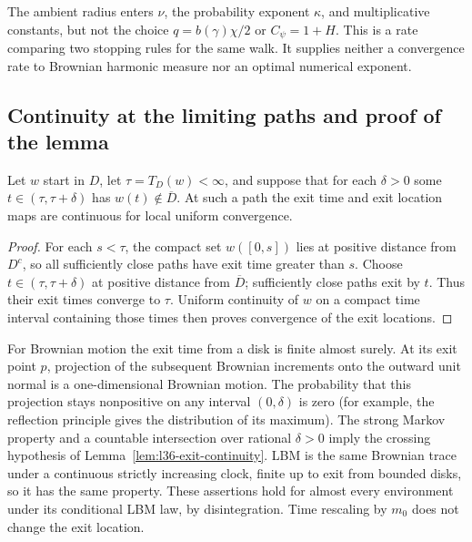 The ambient radius enters $\nu$, the probability exponent
$\kappa$, and multiplicative constants, but not the choice
$q=b(\gamma)\chi/2$ or $C_\psi=1+H$.
This is a rate comparing two stopping rules for the same walk.
It supplies neither a convergence rate to Brownian harmonic
measure nor an optimal numerical exponent.

\subsection{Continuity at the limiting paths and proof of the lemma}
\begin{lemma}\label{lem:l36-exit-continuity}
Let $w$ start in $D$, let $\tau=T_D(w)<\infty$, and suppose that
for each $\delta>0$ some $t\in(\tau,\tau+\delta)$ has
$w(t)\notin\overline D$. At such a path the exit time and exit
location maps are continuous for local uniform convergence.
\end{lemma}
\begin{proof}
For each $s<\tau$, the compact set $w([0,s])$ lies at positive
distance from $D^c$, so all sufficiently close paths have exit
time greater than $s$. Choose $t\in(\tau,\tau+\delta)$ at positive
distance from $\overline D$; sufficiently close paths exit by $t$.
Thus their exit times converge to $\tau$. Uniform continuity of
$w$ on a compact time interval containing those times then proves
convergence of the exit locations.
\end{proof}

For Brownian motion the exit time from a disk is finite almost
surely. At its exit point $p$, projection of the subsequent Brownian
increments onto the outward unit normal is a one-dimensional
Brownian motion. The probability that this projection stays
nonpositive on any interval $(0,\delta)$ is zero (for example,
the reflection principle gives the distribution of its maximum).
The strong Markov property and a countable intersection over
rational $\delta>0$ imply the crossing hypothesis of
Lemma~\ref{lem:l36-exit-continuity}. LBM is the same Brownian trace
under a continuous strictly increasing clock, finite up to exit
from bounded disks, so it has the same property.
These assertions hold for almost every environment under its
conditional LBM law, by disintegration. Time rescaling by $m_0$
does not change the exit location.

